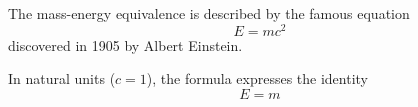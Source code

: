 \documentclass[12pt, letterpaper]{article}
\begin{document}
The mass-energy equivalence is described by the famous equation
\[ E=mc^2 \] discovered in 1905 by Albert Einstein. 

In natural units ($c = 1$), the formula expresses the identity
\begin{equation}
E=m
\end{equation}
\end{document}
